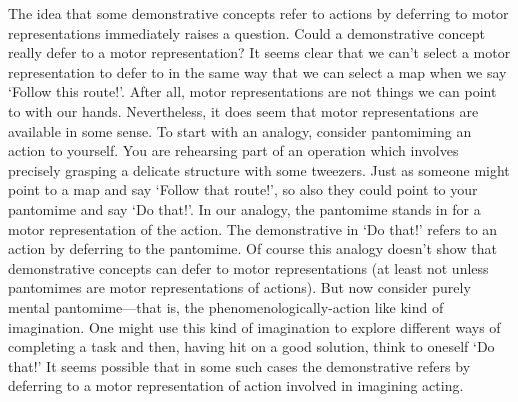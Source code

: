 \documentclass[12pt,\papersize]{extarticle}
\begin{document}
The idea that some demonstrative concepts refer to actions by deferring to motor representations immediately raises a question. Could a demonstrative concept really defer to a motor representation? It seems clear that we can't select a motor representation to defer to in the same way that we can select a map when we say `Follow this route!'. After all, motor representations are not things we can point to with our hands. Nevertheless, it does seem that motor representations are available in some sense. To start with an analogy, consider pantomiming an action to yourself. You are rehearsing part of an operation which involves precisely grasping a delicate structure with some tweezers. Just as someone might point to a map and say `Follow that route!', so also they could point to your pantomime and say `Do that!'. In our analogy, the pantomime stands in for a motor representation of the action.  The demonstrative in `Do that!' refers to an action by deferring to the pantomime. Of course this analogy doesn't show that demonstrative concepts can defer to motor representations (at least not unless pantomimes are motor representations of actions). But now consider purely mental pantomime---that is, the phenomenologically-action like kind of imagination. One might use this kind of imagination to explore different ways of completing a task and then, having hit on a good solution, think to oneself `Do that!' It seems possible that in some such cases the demonstrative refers by deferring to a motor representation of action involved in imagining acting.
\end{document}
